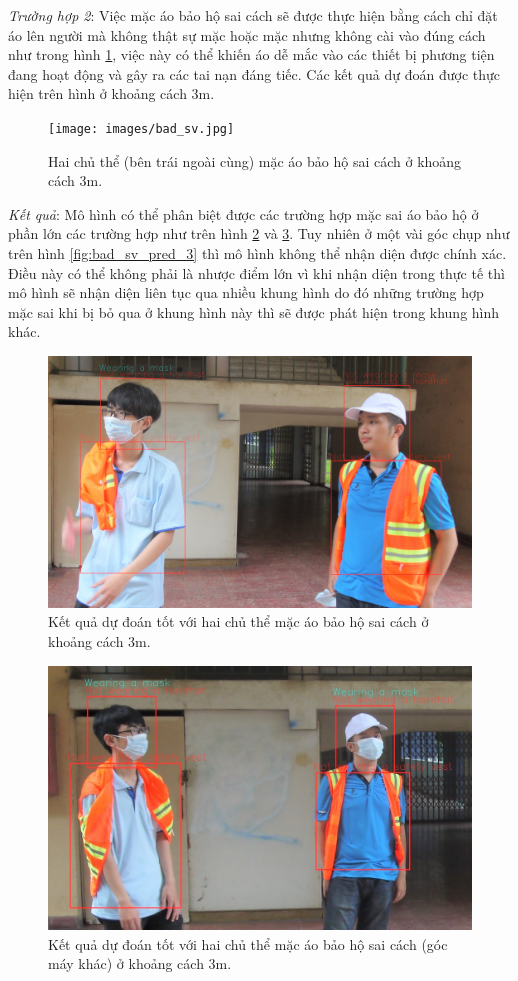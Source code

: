 \emph{Trường hợp 2}: Việc mặc áo bảo hộ sai cách sẽ được thực hiện bằng cách chỉ đặt áo lên người mà không thật sự mặc hoặc mặc nhưng không cài vào đúng cách như trong hình \ref{fig:bad_sv}, việc này có thể khiến áo dễ mắc vào các thiết bị phương tiện đang hoạt động và gây ra các tai nạn đáng tiếc. Các kết quả dự đoán được thực hiện trên hình ở khoảng cách $3$m.
\begin{figure}[ht!]
	\centerline{\texttt{[image: images/bad\_sv.jpg]}}
  	\caption{Hai chủ thể (bên trái ngoài cùng) mặc áo bảo hộ sai cách ở khoảng cách 3m.}
  	\label{fig:bad_sv}
\end{figure}
\emph{Kết quả}: Mô hình có thể phân biệt được các trường hợp mặc sai áo bảo hộ ở phần lớn các trường hợp như trên hình \ref{fig:bad_sv_pred_1} và \ref{fig:bad_sv_pred_2}. Tuy nhiên ở một vài góc chụp như trên hình \ref{fig:bad_sv_pred_3} thì mô hình không thể nhận diện được chính xác. Điều này có thể không phải là nhược điểm lớn vì khi nhận diện trong thực tế thì mô hình sẽ nhận diện liên tục qua nhiều khung hình do đó những trường hợp mặc sai khi bị bỏ qua ở khung hình này thì sẽ được phát hiện trong khung hình khác.
\begin{figure}[ht!]
	\centerline{\includegraphics[scale=0.18]{images/bad_sv_predict_2.jpg}}
  	\caption{Kết quả dự đoán tốt với hai chủ thể mặc áo bảo hộ sai cách ở khoảng cách 3m.}
  	\label{fig:bad_sv_pred_1}
\end{figure}
\begin{figure}[ht!]
	\centerline{\includegraphics[scale=0.35]{images/bad_sv_predict_3.jpg}}
  	\caption{Kết quả dự đoán tốt với hai chủ thể mặc áo bảo hộ sai cách (góc máy khác) ở khoảng cách 3m.}
  	\label{fig:bad_sv_pred_2}
\end{figure}
